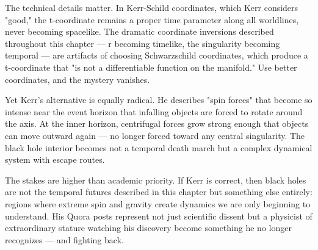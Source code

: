 \begin{commentary}
The technical details matter. In Kerr-Schild coordinates, which Kerr considers "good," the t-coordinate remains a proper time parameter along all worldlines, never becoming spacelike. The dramatic coordinate inversions described throughout this chapter — r becoming timelike, the singularity becoming temporal — are artifacts of choosing Schwarzschild coordinates, which produce a t-coordinate that "is not a differentiable function on the manifold." Use better coordinates, and the mystery vanishes.

Yet Kerr's alternative is equally radical. He describes "spin forces" that become so intense near the event horizon that infalling objects are forced to rotate around the axis. At the inner horizon, centrifugal forces grow strong enough that objects can move outward again — no longer forced toward any central singularity. The black hole interior becomes not a temporal death march but a complex dynamical system with escape routes.

The stakes are higher than academic priority. If Kerr is correct, then black holes are not the temporal futures described in this chapter but something else entirely: regions where extreme spin and gravity create dynamics we are only beginning to understand. His Quora posts represent not just scientific dissent but a physicist of extraordinary stature watching his discovery become something he no longer recognizes — and fighting back.
\end{commentary}